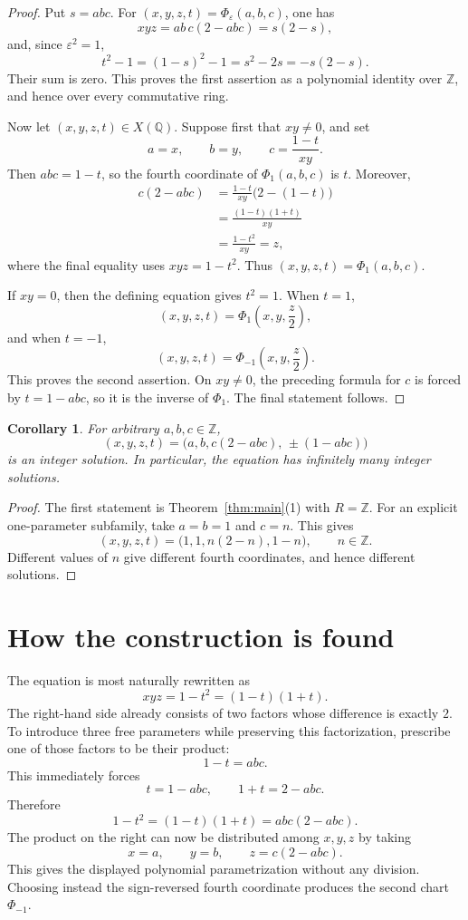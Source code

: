 \documentclass[11pt]{article}
\newtheorem{corollary}[theorem]{Corollary}
\theoremstyle{remark}
\newcommand{\Z}{\mathbb Z}
\newcommand{\Q}{\mathbb Q}
\begin{document}
\begin{proof}
Put \(s=abc\).  For
\((x,y,z,t)=\Phi_\varepsilon(a,b,c)\), one has
\[
xyz=ab\,c(2-abc)=s(2-s),
\]
and, since \(\varepsilon^2=1\),
\[
t^2-1=(1-s)^2-1=s^2-2s=-s(2-s).
\]
Their sum is zero.  This proves the first assertion as a polynomial
identity over \(\Z\), and hence over every commutative ring.

Now let \((x,y,z,t)\in X(\Q)\).  Suppose first that \(xy\ne0\), and set
\[
a=x,\qquad b=y,\qquad c=\frac{1-t}{xy}.
\]
Then \(abc=1-t\), so the fourth coordinate of \(\Phi_1(a,b,c)\) is \(t\).
Moreover,
\[
\begin{aligned}
c(2-abc)
 &=\frac{1-t}{xy}\bigl(2-(1-t)\bigr)\\
 &=\frac{(1-t)(1+t)}{xy}\\
 &=\frac{1-t^2}{xy}=z,
\end{aligned}
\]
where the final equality uses \(xyz=1-t^2\).  Thus
\((x,y,z,t)=\Phi_1(a,b,c)\).

If \(xy=0\), then the defining equation gives \(t^2=1\).  When \(t=1\),
\[
(x,y,z,t)=\Phi_1\left(x,y,\frac z2\right),
\]
and when \(t=-1\),
\[
(x,y,z,t)=\Phi_{-1}\left(x,y,\frac z2\right).
\]
This proves the second assertion.  On \(xy\ne0\), the preceding formula
for \(c\) is forced by \(t=1-abc\), so it is the inverse of \(\Phi_1\).
The final statement follows.
\end{proof}

\begin{corollary}\label{cor:integers}
For arbitrary \(a,b,c\in\Z\),
\[
\boxed{
(x,y,z,t)=\bigl(a,b,c(2-abc),\,\pm(1-abc)\bigr)
}
\]
is an integer solution.  In particular, the equation has infinitely many
integer solutions.
\end{corollary}

\begin{proof}
The first statement is Theorem~\ref{thm:main}(1) with \(R=\Z\).  For an
explicit one-parameter subfamily, take \(a=b=1\) and \(c=n\).  This gives
\[
(x,y,z,t)=\bigl(1,1,n(2-n),1-n\bigr),\qquad n\in\Z.
\]
Different values of \(n\) give different fourth coordinates, and hence
different solutions.
\end{proof}

\section{How the construction is found}

The equation is most naturally rewritten as
\[
xyz=1-t^2=(1-t)(1+t).
\]
The right-hand side already consists of two factors whose difference is
exactly \(2\).  To introduce three free parameters while preserving this
factorization, prescribe one of those factors to be their product:
\[
1-t=abc.
\]
This immediately forces
\[
t=1-abc,
\qquad
1+t=2-abc.
\]
Therefore
\[
1-t^2=(1-t)(1+t)=abc(2-abc).
\]
The product on the right can now be distributed among \(x,y,z\) by taking
\[
x=a,\qquad y=b,\qquad z=c(2-abc).
\]
This gives the displayed polynomial parametrization without any division.
Choosing instead the sign-reversed fourth coordinate produces the second
chart \(\Phi_{-1}\).
\end{document}
